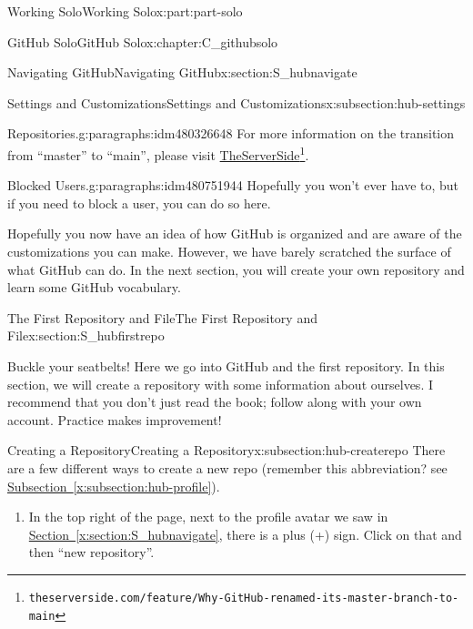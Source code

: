 \documentclass[oneside,10pt,]{book}
\newcommand{\xreffont}{\relax}
\begin{document}
\begin{partptx}{Working Solo}{}{Working Solo}{}{}{x:part:part-solo}
\begin{chapterptx}{GitHub Solo}{}{GitHub Solo}{}{}{x:chapter:C_githubsolo}
\begin{sectionptx}{Navigating GitHub}{}{Navigating GitHub}{}{}{x:section:S_hubnavigate}
\begin{subsectionptx}{Settings and Customizations}{}{Settings and Customizations}{}{}{x:subsection:hub-settings}
\begin{paragraphs}{Repositories.}{g:paragraphs:idm480326648}
For more information on the transition from ``master'' to ``main'', please visit \href{https://www.theserverside.com/feature/Why-GitHub-renamed-its-master-branch-to-main}{TheServerSide}\footnote{\nolinkurl{theserverside.com/feature/Why-GitHub-renamed-its-master-branch-to-main}\label{g:fn:idm480786504}}.%
\end{paragraphs}%
\begin{paragraphs}{Blocked Users.}{g:paragraphs:idm480751944}%
%
Hopefully you won't ever have to, but if you need to block a user, you can do so here.%
\end{paragraphs}%
\end{subsectionptx}
\begin{conclusion}{}%
Hopefully you now have an idea of how GitHub is organized and are aware of the customizations you can make. However, we have barely scratched the surface of what GitHub can do. In the next section, you will create your own repository and learn some GitHub vocabulary.%
\end{conclusion}%
\end{sectionptx}
%
%
\typeout{************************************************}
\typeout{************************************************}
%
\begin{sectionptx}{The First Repository and File}{}{The First Repository and File}{}{}{x:section:S_hubfirstrepo}
%
%
\begin{introduction}{}%
Buckle your seatbelts! Here we go into GitHub and the first repository. In this section, we will create a repository with some information about ourselves. I recommend that you don't just read the book; follow along with your own account. Practice makes improvement!%
\end{introduction}%
%
%
\typeout{************************************************}
\typeout{************************************************}
%
\begin{subsectionptx}{Creating a Repository}{}{Creating a Repository}{}{}{x:subsection:hub-createrepo}
%
There are a few different ways to create a new repo (remember this abbreviation? see \hyperref[x:subsection:hub-profile]{Subsection~{\xreffont\ref{x:subsection:hub-profile}}}).%
\begin{enumerate}
\item{}In the top right of the page, next to the profile avatar we saw in \hyperref[x:section:S_hubnavigate]{Section~{\xreffont\ref{x:section:S_hubnavigate}}}, there is a plus (+) sign. Click on that and then ``new repository''.%

\end{enumerate}
\end{subsectionptx}
\end{sectionptx}
\end{chapterptx}
\end{partptx}
\end{document}
